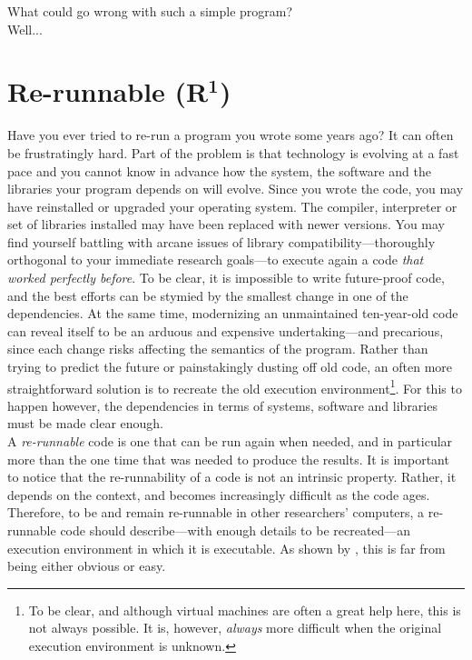 \documentclass[a4paper,11pt]{article}
\begin{document}
What could go wrong with such a simple program?\\
\vfill
Well...
\vfill


\clearpage
\section*{Re-runnable (R$^{\mathbf 1}$)}

Have you ever tried to re-run a program you wrote some years ago? It can often be frustratingly hard. Part of the problem is that technology is evolving at a fast pace and you cannot know in advance how the system, the software and the libraries your program depends on will evolve. Since you wrote the code, you may have reinstalled or upgraded  your operating system. The compiler, interpreter or set of libraries installed may have been replaced with newer versions. You may find yourself battling with arcane issues of library compatibility---thoroughly orthogonal to your immediate research  goals---to execute again a code \emph{that worked perfectly before}. To be clear, it is impossible to write future-proof code, and the best efforts can be stymied by the smallest change in one of the dependencies. At the same time, modernizing an unmaintained ten-year-old code can reveal itself to be an arduous and expensive undertaking---and precarious, since each change risks affecting the semantics of the program. Rather than trying to predict the future or painstakingly dusting off old code, an often more straightforward solution is to recreate the old execution environment\footnote{To be clear, and although virtual machines are often a great help here, this is not always possible. It is, however, \emph{always} more difficult when the original execution environment is unknown.}. For this to happen however, the dependencies in terms of systems, software and libraries must be made clear enough.\\

A \emph{re-runnable} code is one that can be run again when needed, and in particular more than the one time that was needed to produce the results. It is important to notice that the re-runnability of a code is not an intrinsic property. Rather, it depends on the context, and becomes increasingly difficult as the code ages. Therefore, to be and remain re-runnable in other researchers' computers, a re-runnable code should describe---with enough details to be recreated---an execution environment in which it is executable. As shown by \citep{Collberg:2016}, this is far from being either obvious or easy.\\
\end{document}
